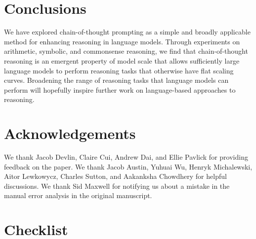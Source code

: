 \documentclass[]{article}
\theoremstyle{plain}
\theoremstyle{definition}
\theoremstyle{remark}
\begin{document}
\section{Conclusions}
We have explored chain-of-thought prompting as a simple and broadly applicable method for enhancing reasoning in language models. 
Through experiments on arithmetic, symbolic, and commonsense reasoning, we find that chain-of-thought reasoning is an emergent property of model scale that allows sufficiently large language models to perform reasoning tasks that otherwise have flat scaling curves.
Broadening the range of reasoning tasks that language models can perform will hopefully inspire further work on language-based approaches to reasoning. 

\clearpage


\section*{Acknowledgements}
We thank Jacob Devlin, Claire Cui, Andrew Dai, and Ellie Pavlick for providing feedback on the paper.
We thank Jacob Austin, Yuhuai Wu, Henryk Michalewski, Aitor Lewkowycz, Charles Sutton, and Aakanksha Chowdhery for helpful discussions. 
We thank Sid Maxwell for notifying us about a mistake in the manual error analysis in the original manuscript.





\clearpage
\section*{Checklist}
\end{document}
